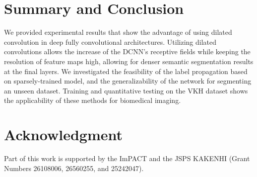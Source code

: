\documentclass[a4paper]{mva_style}
\begin{document}
\section{Summary and Conclusion}
\label{sec:conclusion}
We provided experimental results that show the advantage of using dilated convolution in deep fully convolutional architectures. Utilizing dilated convolutions allows the increase of the DCNN's receptive fields while keeping the resolution of feature maps high, allowing for denser semantic segmentation results at the final layers. We investigated the feasibility of the label propagation based on sparsely-trained model, and the generalizability of the network for segmenting an unseen dataset. Training and quantitative testing on the VKH dataset shows the applicability of these methods for biomedical imaging.%


\section*{Acknowledgment}
\noindent Part of this work is supported by the ImPACT and the JSPS KAKENHI (Grant Numbers 26108006, 26560255, and 25242047).



%
%
%


%
%
%
%

 

\end{document}
